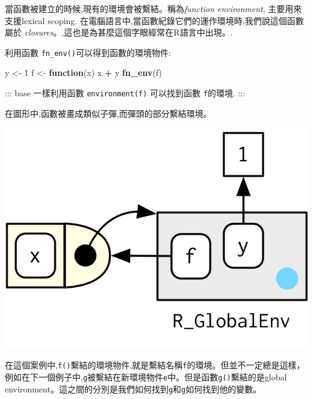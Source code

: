 \documentclass[]{book}
\newenvironment{Shaded}{\begin{snugshade}}{\end{snugshade}}
\newcommand{\KeywordTok}[1]{\textcolor[rgb]{0.13,0.29,0.53}{\textbf{#1}}}
\newcommand{\DecValTok}[1]{\textcolor[rgb]{0.00,0.00,0.81}{#1}}
\newcommand{\StringTok}[1]{\textcolor[rgb]{0.31,0.60,0.02}{#1}}
\newcommand{\ControlFlowTok}[1]{\textcolor[rgb]{0.13,0.29,0.53}{\textbf{#1}}}
\newcommand{\OperatorTok}[1]{\textcolor[rgb]{0.81,0.36,0.00}{\textbf{#1}}}
\newcommand{\NormalTok}[1]{#1}
\theoremstyle{definition}
\theoremstyle{definition}
\theoremstyle{definition}
\theoremstyle{remark}
\begin{document}
當函數被建立的時候,現有的環境會被繫結。稱為\emph{function environment},
主要用來支援lexical scoping.
在電腦語言中,當函數紀錄它們的運作環境時,我們說這個函數屬於
\emph{closures}。,這也是為甚麼這個字眼經常在R語言中出現。.

利用函數 \texttt{fn\_env()}可以得到函數的環境物件:

\begin{Shaded}
\begin{Highlighting}[]
\NormalTok{y <-}\StringTok{ }\DecValTok{1}
\NormalTok{f <-}\StringTok{ }\ControlFlowTok{function}\NormalTok{(x) x }\OperatorTok{+}\StringTok{ }\NormalTok{y}
\KeywordTok{fn_env}\NormalTok{(f)}
\end{Highlighting}
\end{Shaded}

::: base 一樣利用函數 \texttt{environment(f)} 可以找到函數
\texttt{f}的環境. :::

在圖形中,函數被畫成類似子彈,而彈頭的部分繫結環境。

\begin{center}\includegraphics{diagrams/environments/binding} \end{center}

在這個案例中,\texttt{f()}繫結的環境物件,就是繫結名稱\texttt{f}的環境。但並不一定總是這樣，例如在下一個例子中,\texttt{g}被繫結在新環境物件\texttt{e}中。但是函數\texttt{g()}繫結的是global
environment。這之間的分別是我們如何找到\texttt{g}和\texttt{g}如何找到他的變數。

\begin{Shaded}
\end{Shaded}
\end{document}

